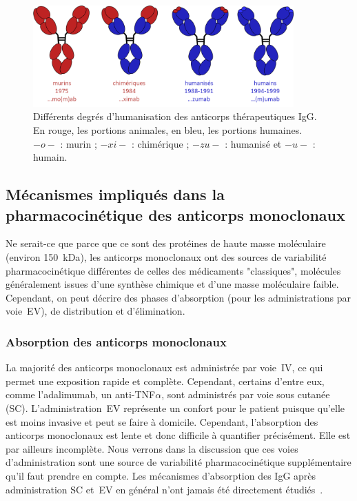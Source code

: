 \begin{figure}[htbp]
	\centering
		\includegraphics[width=10cm]{figures/raster/FIG_12}
	\caption[Différents degrés d'humanisation des anticorps thérapeutiques IgG.]{Différents degrés d'humanisation des anticorps thérapeutiques IgG. En rouge, les portions animales, en bleu, les portions humaines. $-o-$ : murin ; $-xi-$ : chimérique ; $-zu-$ : humanisé et $-u-$ : humain.}
	\label{fig:12}
\end{figure}

\subsection{Mécanismes impliqués dans la pharmacocinétique des anticorps monoclonaux}
Ne serait-ce que parce que ce sont des protéines de haute masse moléculaire (environ 150~k\gls{Da}), les anticorps monoclonaux ont des sources de variabilité pharmacocinétique différentes de celles des médicaments "classiques", molécules généralement issues d'une synthèse chimique et d'une masse moléculaire faible. Cependant, on peut décrire des phases d'absorption (pour les administrations par voie~\gls{EV}), de distribution et d'élimination.

\subsubsection{Absorption des anticorps monoclonaux}
La majorité des anticorps monoclonaux est administrée par voie~\gls{IV}, ce qui permet une exposition rapide et complète. Cependant, certains d'entre eux, comme l'adalimumab, un anti-TNF$\alpha$, sont administrés par voie sous cutanée (SC). L'administration~\gls{EV} représente un confort pour le patient puisque qu'elle est moins invasive et peut se faire à domicile. Cependant, l'absorption des anticorps monoclonaux est lente et donc difficile à quantifier précisément. Elle est par ailleurs incomplète. Nous verrons dans la discussion que ces voies d'administration sont une source de variabilité pharmacocinétique supplémentaire qu'il faut prendre en compte. Les mécanismes d'absorption des IgG après administration SC et~\gls{EV} en général n'ont jamais été directement étudiés~\citep{REF18}. 


